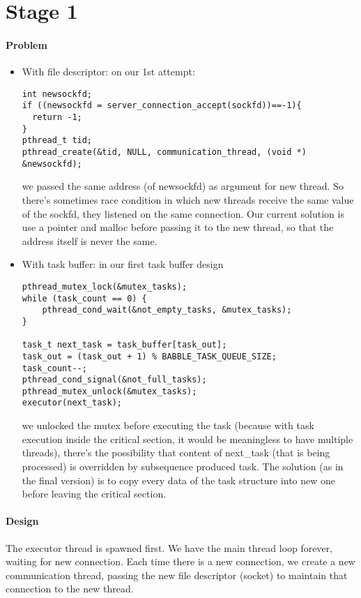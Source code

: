 \documentclass{article}
\begin{document}
\section{Stage 1}
\paragraph{Problem}
\begin{itemize}
\item With file descriptor: on our 1st attempt:
\begin{lstlisting}
int newsockfd;
if ((newsockfd = server_connection_accept(sockfd))==-1){
  return -1;
}
pthread_t tid;
pthread_create(&tid, NULL, communication_thread, (void *) &newsockfd);
\end{lstlisting}
we passed the same address (of newsockfd) as argument for new thread. So there's sometimes race condition in which new threads receive the same value of the sockfd, they listened on the same connection. Our current solution is use a pointer and malloc before passing it to the new thread, so that the address itself is never the same.
\item With	task buffer: in our first task buffer design
\begin{lstlisting}
pthread_mutex_lock(&mutex_tasks);
while (task_count == 0) {
    pthread_cond_wait(&not_empty_tasks, &mutex_tasks);
}

task_t next_task = task_buffer[task_out];
task_out = (task_out + 1) % BABBLE_TASK_QUEUE_SIZE;
task_count--;
pthread_cond_signal(&not_full_tasks);
pthread_mutex_unlock(&mutex_tasks);
executor(next_task);
\end{lstlisting}
we unlocked the mutex before executing the task (because with task execution inside the critical section, it would be meaningless to have multiple threads), there's the possibility that content of next\_task (that is being processed) is overridden by subsequence produced task. The solution (as in the final version) is to copy every data of the task structure into new one before leaving the critical section.
\end{itemize}

\paragraph{Design} The executor thread is spawned first. We have the main thread loop forever, waiting for new connection. Each time there is a new connection, we create a new communication thread, passing the new file descriptor (socket) to maintain that connection to the new thread.
\end{document}
